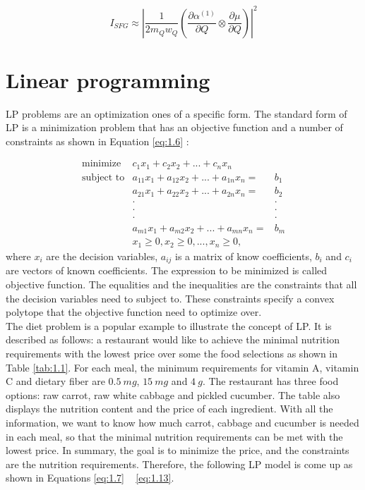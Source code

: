 \begin{equation} \label{eq:1.5}
I_{SFG} \approx \left| \frac{1}{2m_{Q}w_{Q}} \left( \frac{\partial\alpha^{(1)}}{\partial Q} \otimes \frac{\partial\mu}{\partial Q} \right) \right|^{2}
\end{equation}

\section{Linear programming}
LP problems are an optimization ones of a specific form. The standard form of LP is a minimization problem that has an objective function and a number of constraints as shown in Equation \ref{eq:1.6} \cite{UULP}:

\begin{eqnarray}  \label{eq:1.6}
 \text{minimize} & c_{1}x_{1} + c_{2}x_{2} + ... + c_{n} x_{n}  \nonumber \\
 \text{subject to} & a_{11} x_{1} + a_{12} x_{2}+ ... + a_{1n} x_{n} = & b_{1} \nonumber \\
& a_{21} x_{1} + a_{22} x_{2} + ... + a_{2n} x_{n} = & b_{2} \nonumber \\
&\cdot                                    &\cdot \nonumber \\
&\cdot                                    &\cdot \nonumber \\
&\cdot                                    &\cdot \nonumber \\
& a_{m1} x_{1} + a_{m2} x_{2} + ... + a_{mn} x_{n} = & b_{m} \nonumber \\
& x_{1} \geq 0, x_{2} \geq 0, ... ,x_{n} \geq 0, 
\end{eqnarray} 
where $x_{i}$ are the decision variables, $a_{ij}$ is a matrix of know coefficients, $b_{i}$ and $c_{i}$ are vectors of known coefficients. The expression to be minimized is called objective function. The equalities and the inequalities are the constraints that all the decision variables need to subject to. These constraints specify a convex polytope that the objective function need to optimize over. \\ 

The diet problem is a popular example to illustrate the concept of LP. It is described as follows: a restaurant would like to achieve the minimal nutrition requirements with the lowest price over some the food selections as shown in Table \ref{tab:1.1}. For each meal, the minimum requirements for vitamin A, vitamin C and dietary fiber are $0.5~mg$, $15~mg$ and $4~g$. The restaurant has three food options: raw carrot, raw white cabbage and pickled cucumber. The table also displays the nutrition content and the price of each ingredient. With all the information, we want to know how much carrot, cabbage and cucumber is needed in each meal, so that the minimal nutrition requirements can be met with the lowest price. In summary, the goal is to minimize the price, and the constraints are the nutrition requirements. Therefore, the following LP model is come up as shown in Equations \ref{eq:1.7} ~ \ref{eq:1.13}.

